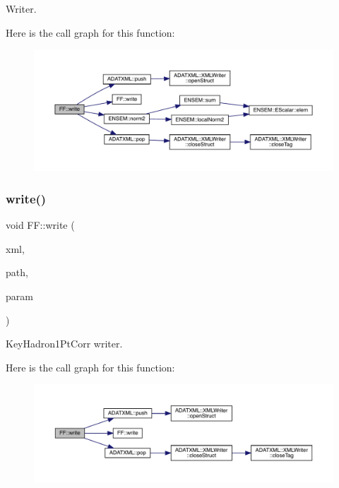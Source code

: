 Writer. 

Here is the call graph for this function\+:\nopagebreak
\begin{figure}[H]
\begin{center}
\leavevmode
\includegraphics[width=350pt]{d5/da6/namespaceFF_a5f456c76a7fdfa1dd9305ebda8793354_cgraph}
\end{center}
\end{figure}
\mbox{\label{namespaceFF_ab36d46cd7c78477e7dcc2679d6cadd26}} 
\subsubsection{\texorpdfstring{write()}{write()}\hspace{0.1cm}{\footnotesize\ttfamily [4/13]}}
{\footnotesize\ttfamily void F\+F\+::write (\begin{DoxyParamCaption}\item[{X\+M\+L\+Writer \&}]{xml,  }\item[{const std\+::string \&}]{path,  }\item[{const \mbox{\hyperlink{structFF_1_1KeyHadron1PtCorr__t}{Key\+Hadron1\+Pt\+Corr\+\_\+t}} \&}]{param }\end{DoxyParamCaption})}



Key\+Hadron1\+Pt\+Corr writer. 

Here is the call graph for this function\+:\nopagebreak
\begin{figure}[H]
\begin{center}
\leavevmode
\includegraphics[width=350pt]{d5/da6/namespaceFF_ab36d46cd7c78477e7dcc2679d6cadd26_cgraph}
\end{center}
\end{figure}
\mbox{\label{namespaceFF_a831b58b450a964b114e0fce65fc4de99}} 
